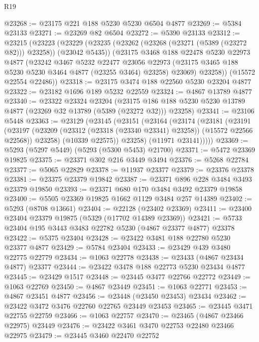 \begin{lexlean}{R19}
\begin{coremodule}
@23268 := @23175 @221 @188 @5230 @5230 @6504 @4877
@23269 := @5384 @23133
@23271 := @23269 @82 @6504
@23272 := @5390 @23133
@23312 := @23215
    (@23223
      (@23229
        (@23235 (@23262 (@23268 (@23271 (@5389 (@23272 @82))) @23258)) (@23042 @5435))
        (@23175
          @3468
          @188
          @22478
          @5230
          @22973
          @4877
          (@23242
            @3467
            @5232
            @22477
            @23056
            @22973
            (@23175 @3465 @188 @5230 @5230 @3464 @4877 (@23255 @3464) @23258)
            @23069)
          @23258))
      (@15572 @22554 @22486))
@23318 := @23175 @3474 @188 @22560 @5230 @23204 @4877
@23322 := @23182 @1696 @189 @5232 @22559
@23324 := @4867 @13789 @4877
@23340 := @23322
    @23324
    @23204
    (@23175 @186 @188 @5230 @5230 @13789 @4877 (@23269 @32 @13789 (@5389 (@23272 @32))) @23258)
@23341 := @23106 @5448
@23363 := @23129
    (@23145
      (@23151
        (@23164
          (@23174
            (@23181
              (@23191
                (@23197
                  (@23209 (@23312 (@23318 (@23340 @23341) @23258)) (@15572 @22566 @22568))
                  @23258)
                (@10339 @22575))
              @23258)
            (@11971 @23141)))))
@23369 := @5293 (@5297 @5449) (@5293 (@5300 @5453) @21700)
@23371 := @5472 @23369 @19825
@23375 := @23371 @302 @216 @3449 @3494
@23376 := @5268 @22784
@23377 := @5065 @22829
@23378 := @11937 @23377
@23379 := @23376 @23378
@23381 := @23375 @23379 @19842
@23387 := @23371 @896 @228 @3484 @3493 @23379 @19850
@23393 := @23371 @680 @170 @3484 @3492 @23379 @19858
@23400 := @5505 @23369 @19825 @1662 @1129 @3484 @257 @14389
@23402 := @5293 (@8708 @13661)
@23404 := @22128 (@23402 @23369)
@23411 := @23400 @23404 @23379 @19875 (@5329 (@17702 @14389 @23369))
@23421 := @5733 @23404 @195 @3443 @3483 @22782 @5230 (@4867 @23377 @4877) @23378
@23422 := @5375 @23404
@23428 := @23422 @3481 @188 @22780 @5230 @23377 @4877
@23429 := @5784 @23404
@23433 := @23429 @439 @3480 @22775 @22779
@23434 := @1063 @22778
@23438 := @23433 (@4867 @23434 @4877) @23377
@23444 := @23422 @3478 @188 @22773 @5230 @23434 @4877
@23445 := @23429 @1517
@23448 := @23445 @3477 @22766 @22772
@23449 := @1063 @22769
@23450 := @4867 @23449
@23451 := @1063 @22771
@23453 := @4867 @23451 @4877
@23456 := @23448 (@23450 @23453) @23434
@23462 := @23422 @3472 @3476 @22760 @22765 @23449 @23453
@23465 := @23445 @3471 @22755 @22759
@23466 := @1063 @22757
@23470 := @23465 (@4867 @23466 @22975) @23449
@23476 := @23422 @3461 @3470 @22753 @22480 @23466 @22975
@23479 := @23445 @3460 @22470 @22752

\end{coremodule}
\end{lexlean}
